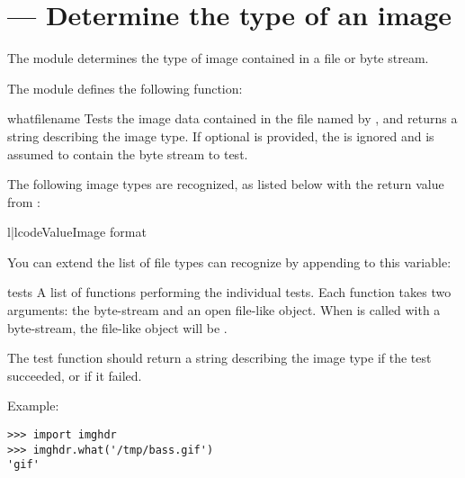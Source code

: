 \section{ ---
         Determine the type of an image}



The  module determines the type of image contained in a
file or byte stream.

The  module defines the following function:


\begin{funcdesc}{what}{filename}
Tests the image data contained in the file named by ,
and returns a string describing the image type.  If optional 
is provided, the  is ignored and  is assumed to
contain the byte stream to test.
\end{funcdesc}

The following image types are recognized, as listed below with the
return value from :

\begin{tableii}{l|l}{code}{Value}{Image format}
\end{tableii}

You can extend the list of file types  can recognize by
appending to this variable:

\begin{datadesc}{tests}
A list of functions performing the individual tests.  Each function
takes two arguments: the byte-stream and an open file-like object.
When  is called with a byte-stream, the file-like
object will be .

The test function should return a string describing the image type if
the test succeeded, or  if it failed.
\end{datadesc}

Example:

\begin{verbatim}
>>> import imghdr
>>> imghdr.what('/tmp/bass.gif')
'gif'
\end{verbatim}
